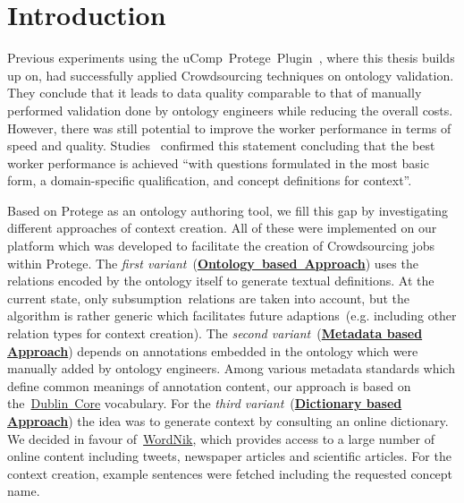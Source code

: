 \section{Introduction}\label{sec:approaches_introduction}
Previous experiments using the uComp~Protege~Plugin~\cite{wohlgenannt2016}, where this thesis builds up on, had successfully applied Crowdsourcing techniques on ontology validation. They conclude that it leads to data quality comparable to that of manually performed validation done by ontology engineers while reducing the overall costs. However, there was still potential to improve the worker performance in terms of speed and quality. 
Studies~\cite{mortensen2013} confirmed this statement concluding that the best worker performance is achieved
\enquote{with questions formulated in the most basic form, a domain-specific qualification, and concept definitions for context}.

Based on Protege as an ontology authoring tool, we fill this gap by investigating different approaches of context creation. All of these were implemented on our platform which was developed to facilitate the creation of Crowdsourcing jobs within Protege.
The \emph{first variant}~(\hyperref[sec:enrichment_ontology_approach]{\textbf{Ontology~based~Approach}}) uses the relations encoded by the ontology itself to generate textual definitions. At the current state, only subsumption~relations are taken into account, but the algorithm is rather generic which facilitates future adaptions~(e.g. including other relation types for context creation).
The \emph{second variant}~(\hyperref[sec:enrichment_metaData_approach]{\textbf{Metadata based Approach}}) depends on annotations embedded in the ontology which were manually added by ontology engineers. Among various metadata standards which define common meanings of annotation content, our approach is based on the~\hyperref[sec:dublin_core_metadata_vocabulary]{Dublin~Core} vocabulary.
For the \emph{third variant}~(\hyperref[sec:enrichment_dictionary_approach]{\textbf{Dictionary based Approach}}) the idea was to generate context by consulting an online dictionary. We decided in favour of~\hyperref[sec:wordnik]{WordNik}, which provides access to a large number of online content including tweets, newspaper articles and scientific articles. For the context creation, example sentences were fetched including the requested concept name. 
